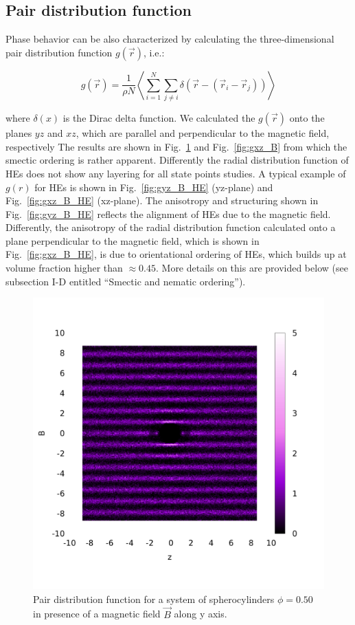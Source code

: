 \documentclass[aip,graphicx]{revtex4-1} %
\begin{document}
\subsection{Pair distribution function}

Phase behavior can be also characterized by calculating the three-dimensional pair distribution function $g(\vec{r})$, i.e.:

\begin{equation}
    g(\vec{r}) = \frac{1}{\rho N} \left\langle \sum_{i=1}^N \sum_{j\neq i} \delta \left( \vec{r} - \left( \vec{r}_i - \vec{r}_j \right) \right) \right\rangle
\end{equation}

where $\delta(x)$ is the Dirac delta function. 
We calculated the $g(\vec{r})$ onto the planes $yz$ and $xz$, which are parallel and perpendicular to the magnetic field, respectively
The results are shown in Fig.~\ref{fig:gyz_B} and Fig.~\ref{fig:gxz_B} from which the smectic ordering is rather apparent.
Differently the radial distribution function of HEs does not show any
layering for all state points studies. A typical example of $g(r)$ for HEs is shown in Fig.~\ref{fig:gyz_B_HE} (yz-plane) and 
Fig.~\ref{fig:gxz_B_HE} (xz-plane). The anisotropy and structuring shown in Fig.~\ref{fig:gyz_B_HE} reflects the alignment 
of HEs due to the magnetic field. Differently, the anisotropy
of the radial distribution function calculated onto a plane perpendicular to the magnetic field, which is shown in 
Fig.~\ref{fig:gxz_B_HE}, is due to orientational ordering of HEs, which builds up at volume fraction higher than $\approx 0.45$.  
More details on this are provided below (see subsection I-D entitled ``Smectic and nematic ordering'').

\begin{figure}
    \begin{center}
    \includegraphics[width=0.5\columnwidth]{gyz_B.png}
    \caption{Pair distribution function for a system of spherocylinders $\phi = 0.50$ in presence of a magnetic field $\vec{B}$ along y axis.}\label{fig:gyz_B}
    \end{center}
\end{figure}
\end{document}
